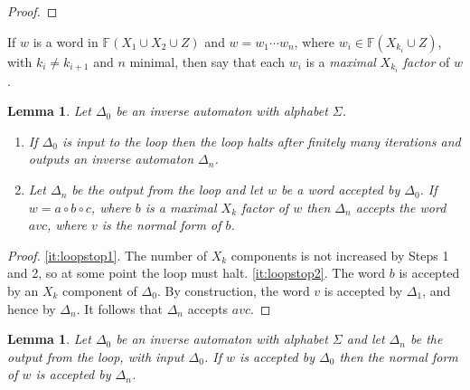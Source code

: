 \documentclass[a4paper,12pt]{article}
\renewcommand{\a}{\alpha }
\renewcommand{\b}{\beta }
\newcommand{\g}{\gamma }
\newcommand{\D}{\Delta }
\newcommand{\T}{\Theta }
\renewcommand{\S}{\Sigma }
\newtheorem{lemma}[theorem]{Lemma}
\numberwithin{equation}{section}
\numberwithin{figure}{section}
\newcommand{\FF}{\ensuremath{\mathbb{F}}}
\newcommand{\be}{\begin{enumerate}}
\newcommand{\ee}{\end{enumerate}}
\begin{document}
\begin{proof}

\end{proof}
If $w$ is a word in $\FF(X_1\cup X_2\cup Z)$ and $w=w_1\cdots w_n$,
where $w_i\in \FF(X_{k_i}\cup Z)$, with $k_i\neq k_{i+1}$ and $n$
minimal, then  say that each $w_i$ is a \emph {maximal} $X_{k_i}$
\emph{factor}
of $w$.
\begin{lemma}\label{lem:loopstop}
Let $\D_0$ be an inverse automaton with alphabet $\S$.
\be
\item\label{it:loopstop1}
If $\D_0$ is input  to  the loop then the loop halts after
finitely many iterations and outputs an inverse automaton  $\D_n$.
\item\label{it:loopstop2} Let $\D_n$ be the output from the loop and let $w$ be a word
accepted by $\D_0$. If $w=a\circ b \circ c$,
where $b$ is a maximal $X_k$ factor of $w$ then $\D_n$ accepts
the word $avc$, where $v$ is the normal form of $b$.
\ee
\end{lemma}
\begin{proof}
\ref{it:loopstop1}. The number of $X_k$ components is not
increased by Steps 1 and 2, so at some point the loop must halt.
\noindent \ref{it:loopstop2}. The word $b$ is accepted by an $X_k$
component of $\D_0$. By construction, the word $v$ is accepted by
$\D_1$, and hence by $\D_n$. It follows that $\D_n$ accepts $avc$.
\end{proof}
\begin{lemma}\label{lem:nfacc}
Let $\D_0$ be an inverse automaton with alphabet $\S$ and let
$\D_n$ be the output from the loop, with input $\D_0$. If $w$ is
accepted by $\D_0$ then the normal form of $w$ is accepted by $\D_n$.
\end{lemma}
\end{document}
